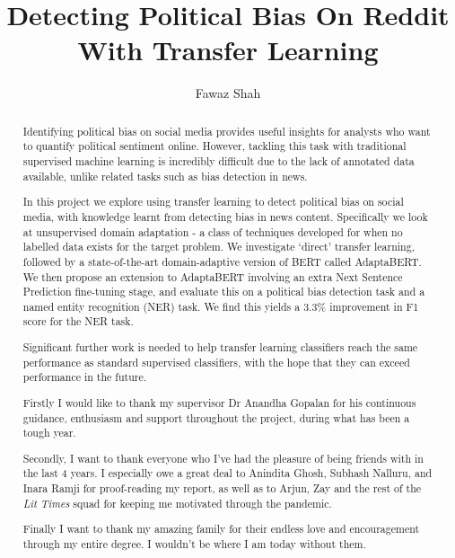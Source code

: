 \documentclass[a4paper, twoside]{report}
\title{Detecting Political Bias On Reddit With Transfer Learning}
\author{Fawaz Shah}
\begin{document}


\begin{abstract}

Identifying political bias on social media provides useful insights for analysts who want to quantify political sentiment online. However, tackling this task with traditional supervised machine learning is incredibly difficult due to the lack of annotated data available, unlike related tasks such as bias detection in news.

In this project we explore using transfer learning to detect political bias on social media, with knowledge learnt from detecting bias in news content. Specifically we look at unsupervised domain adaptation - a class of techniques developed for when no labelled data exists for the target problem. We investigate `direct' transfer learning, followed by a state-of-the-art domain-adaptive version of BERT called AdaptaBERT. We then propose an extension to AdaptaBERT involving an extra Next Sentence Prediction fine-tuning stage, and evaluate this on a political bias detection task and a named entity recognition (NER) task. We find this yields a 3.3\% improvement in F1 score for the NER task.

Significant further work is needed to help transfer learning classifiers reach the same performance as standard supervised classifiers, with the hope that they can exceed performance in the future.

\end{abstract}

\renewcommand{\abstractname}{Acknowledgements}
\begin{abstract}

Firstly I would like to thank my supervisor Dr Anandha Gopalan for his continuous guidance, enthusiasm and support throughout the project, during what has been a tough year.

Secondly, I want to thank everyone who I've had the pleasure of being friends with in the last 4 years. I especially owe a great deal to Anindita Ghosh, Subhash Nalluru, and Inara Ramji for proof-reading my report, as well as to Arjun, Zay and the rest of the \textit{Lit Times} squad for keeping me motivated through the pandemic.

Finally I want to thank my amazing family for their endless love and encouragement through my entire degree. I wouldn't be where I am today without them.

\end{abstract}

\tableofcontents
\listoffigures
\listoftables









\end{document}
